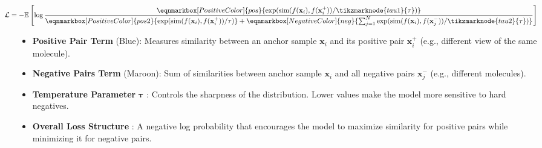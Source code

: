 \documentclass[11pt, oneside]{article}
\begin{document}
\begin{tcolorbox}[
    title=InfoNCE Loss Function,
    breakable,
    enhanced,
    colback=white,
    colframe=black!30,
    colbacktitle=black!10,
    coltitle=black,
    fonttitle=\bfseries,
    boxrule=0.5mm,
    left=2mm,
    right=2mm,
    top=4mm,
    bottom=4mm,
    middle=10mm
]

\begin{center}
\begin{minipage}{0.9\linewidth}

\begin{equation}
\label{eq:infonce}
\hspace*{-2em}
\mathcal{L} = 
-\mathbb{E} \left[ \log \frac{
\eqnmarkbox[PositiveColor]{pos}{\exp({\text{sim}(f(\mathbf{x}_i), f(\mathbf{x}_i^+))/\tikzmarknode{tau1}{\tau}})}
}{
\eqnmarkbox[PositiveColor]{pos2}{\exp({\text{sim}(f(\mathbf{x}_i), f(\mathbf{x}_i^+))/\tau})} + 
\eqnmarkbox[NegativeColor]{neg}{\sum_{j=1}^{N} \exp({\text{sim}(f(\mathbf{x}_i), f(\mathbf{x}_j^-))/\tikzmarknode{tau2}{\tau}})}
} \right]
\end{equation}


\end{minipage}
\end{center}

\tcblower


\begin{itemize}
\item \textbf{Positive Pair Term} ({\color{PositiveColor}Blue}): Measures similarity between an anchor sample $\mathbf{x}_i$ and its positive pair $\mathbf{x}_i^+$ (e.g., different view of the same molecule).

\item \textbf{Negative Pairs Term} ({\color{NegativeColor}Maroon}): Sum of similarities between anchor sample $\mathbf{x}_i$ and all negative pairs $\mathbf{x}_j^-$ (e.g., different molecules).

\item \textbf{Temperature Parameter} $\boldsymbol{\tau}$ : Controls the sharpness of the distribution. Lower values make the model more sensitive to hard negatives.

\item \textbf{Overall Loss Structure} : A negative log probability that encourages the model to maximize similarity for positive pairs while minimizing it for negative pairs.
\end{itemize}

\end{tcolorbox}
\end{document}
